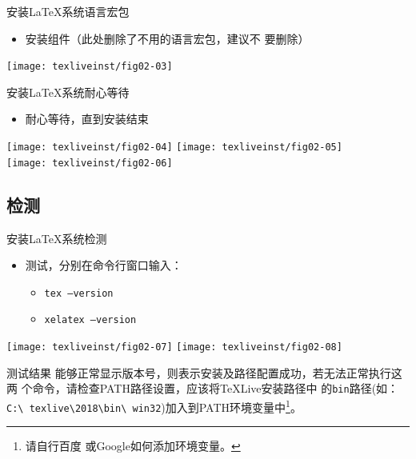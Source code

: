 \documentclass[xcolor=svgnames, t, aspectratio=169]{ctexbeamer}
\begin{document}
\begin{frame}[t]{安装\LaTeX 系统}{语言宏包}
  \begin{itemize}
  \item 安装组件（此处删除了不用的语言宏包，\alert{建议不
      要删除}）
  \end{itemize}
  \centering
  \texttt{[image: texliveinst/fig02-03]}
\end{frame}

\begin{frame}[t]{安装\LaTeX 系统}{耐心等待}
    \begin{itemize}
    \item 耐心等待，直到安装结束
    \end{itemize}
    \centering
    \texttt{[image: texliveinst/fig02-04]}
    \qquad
    \texttt{[image: texliveinst/fig02-05]}
    \\[1ex]
    \texttt{[image: texliveinst/fig02-06]}
\end{frame}
\subsection[检测]{检测\TeXLive }
\begin{frame}[t]{安装\LaTeX 系统}{检测\TeXLive }
  \stretchon
  \begin{itemize}
  \item 测试，分别在命令行窗口输入：
    \begin{itemize}
    \item {\texttt{tex --version}}
    \item {\texttt{xelatex --version}}
    \end{itemize}
  \end{itemize}
  \centering 
  \texttt{[image: texliveinst/fig02-07]}
  \qquad
  \texttt{[image: texliveinst/fig02-08]}
  \begin{minipage}[h]{0.6\linewidth}
    \begin{block}{测试结果}
      \scriptsize      
      能够正常显示版本号，则表示安装及路径配置成功，若无法正常执行这两
      个命令，请检查PATH路径设置，应该将{\TeX}Live安装路径中
      的\texttt{bin}路径(如：\texttt{C:\textbackslash
        texlive\textbackslash 2018\textbackslash bin\textbackslash
        win32})加入到PATH环境变量中\footnote[frame]{请自行百度
        或Google如何添加环境变量。}。
    \end{block}
  \end{minipage}
  \stretchoff
\end{frame}
\end{document}
